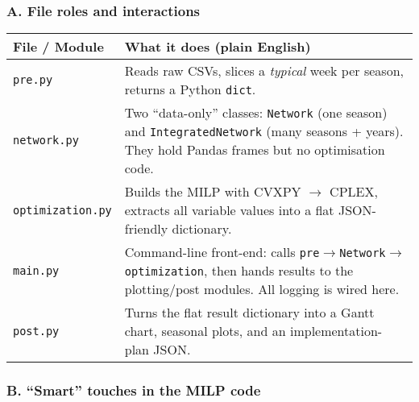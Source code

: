 \subsubsection*{A.  File roles and interactions}

\begin{center}\small
\begin{tabular}{p{3cm}p{9cm}}

\toprule
\textbf{File / Module} & \textbf{What it does (plain English)} \\ 

\midrule
\texttt{pre.py} & Reads raw CSVs, slices a \emph{typical} week per season, returns a Python \texttt{dict}. \\
\texttt{network.py} & Two “data-only” classes:  
\texttt{Network} (one season) and \texttt{IntegratedNetwork} (many seasons + years).  
They hold Pandas frames but no optimisation code. \\
\texttt{optimization.py} & Builds the MILP with CVXPY \(\rightarrow\) CPLEX, extracts all variable
values into a flat JSON-friendly dictionary. \\
\texttt{main.py} & Command-line front-end: calls \texttt{pre}\(\rightarrow\)\texttt{Network}\(\rightarrow\)\texttt{optimization},
then hands results to the plotting/post modules. All logging is wired here. \\
\texttt{post.py} & Turns the flat result dictionary into a Gantt chart, seasonal plots, and an implementation-plan JSON.\\
\bottomrule
\end{tabular}
\end{center}

\subsubsection*{B.  “Smart” touches in the MILP code}

